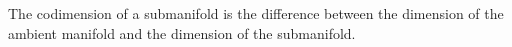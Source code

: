 The codimension of a submanifold is the difference between the dimension of the ambient manifold and the dimension of the submanifold.
